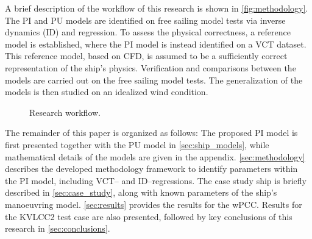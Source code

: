 A brief description of the workflow of this research is shown in \autoref{fig:methodology}.
The PI and PU models are identified on free sailing model tests \citep{alexandersson_wpcc_2024} via inverse dynamics (ID) \citep{faber_inverse_2018} and regression. To assess the physical correctness, a reference model is established, where the PI model is instead identified on a VCT dataset. This reference model, based on CFD, is assumed to be a sufficiently correct representation of the ship's physics.
Verification and comparisons between the models are carried out on the free sailing model tests. The generalization of the models is then studied on an idealized wind condition.
%
\begin{figure}[h]
  \centering
  
  \caption{Research workflow.}
  \label{fig:methodology}
\end{figure}

The remainder of this paper is organized as follows: The proposed PI model is first presented together with the PU 
 model in \autoref{sec:ship_models}, while mathematical details of the models are given in the appendix. 
\autoref{sec:methodology} describes the developed methodology framework to identify parameters within the PI model, including VCT-- and ID--regressions. The case study ship is briefly described in \autoref{sec:case_study}, along with known parameters of the ship’s manoeuvring model. \autoref{sec:results} provides the results for the wPCC. Results for the KVLCC2 test case are also presented, followed by key conclusions of this research in \autoref{sec:conclusions}.